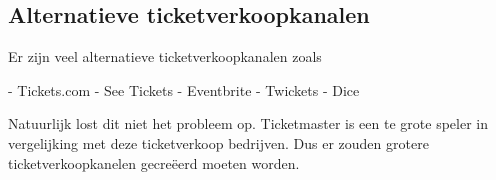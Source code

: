 \subsection{Alternatieve ticketverkoopkanalen}

Er zijn veel alternatieve ticketverkoopkanalen zoals

- Tickets.com
- See Tickets
- Eventbrite
- Twickets
- Dice

Natuurlijk lost dit niet het probleem op. Ticketmaster is een te grote speler in vergelijking met deze ticketverkoop
bedrijven. Dus er zouden grotere ticketverkoopkanelen gecreëerd moeten worden.


